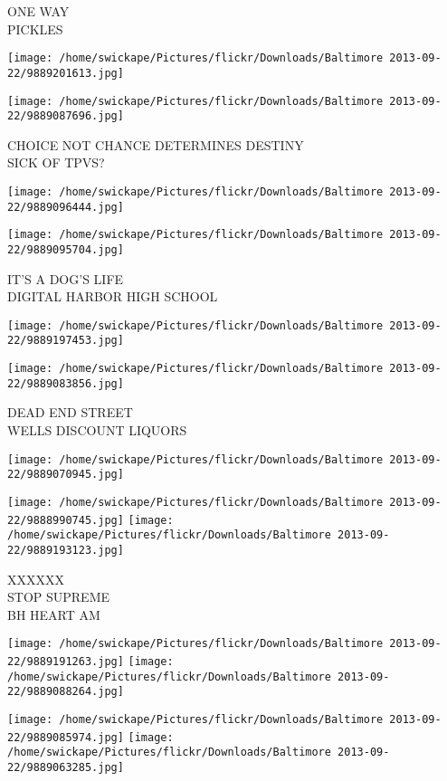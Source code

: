 \documentclass[10pt,letterpaper]{article}
\begin{document}
ONE WAY\\
PICKLES
\pagebreak

\texttt{[image: /home/swickape/Pictures/flickr/Downloads/Baltimore 2013-09-22/9889201613.jpg]}

\vspace{0.25in}
\texttt{[image: /home/swickape/Pictures/flickr/Downloads/Baltimore 2013-09-22/9889087696.jpg]}

CHOICE NOT CHANCE DETERMINES DESTINY\\
SICK OF TPVS?
\pagebreak

\texttt{[image: /home/swickape/Pictures/flickr/Downloads/Baltimore 2013-09-22/9889096444.jpg]}

\vspace{0.25in}
\texttt{[image: /home/swickape/Pictures/flickr/Downloads/Baltimore 2013-09-22/9889095704.jpg]}

IT'S A DOG'S LIFE\\
DIGITAL HARBOR HIGH SCHOOL
\pagebreak

\texttt{[image: /home/swickape/Pictures/flickr/Downloads/Baltimore 2013-09-22/9889197453.jpg]}

\vspace{0.25in}
\texttt{[image: /home/swickape/Pictures/flickr/Downloads/Baltimore 2013-09-22/9889083856.jpg]}

DEAD END STREET\\
WELLS DISCOUNT LIQUORS
\pagebreak

\texttt{[image: /home/swickape/Pictures/flickr/Downloads/Baltimore 2013-09-22/9889070945.jpg]}

\vspace{0.25in}
\texttt{[image: /home/swickape/Pictures/flickr/Downloads/Baltimore 2013-09-22/9888990745.jpg]}
\texttt{[image: /home/swickape/Pictures/flickr/Downloads/Baltimore 2013-09-22/9889193123.jpg]}

XXXXXX\\
STOP SUPREME\\
BH HEART AM
\pagebreak

\texttt{[image: /home/swickape/Pictures/flickr/Downloads/Baltimore 2013-09-22/9889191263.jpg]}
\texttt{[image: /home/swickape/Pictures/flickr/Downloads/Baltimore 2013-09-22/9889088264.jpg]}

\texttt{[image: /home/swickape/Pictures/flickr/Downloads/Baltimore 2013-09-22/9889085974.jpg]}
\texttt{[image: /home/swickape/Pictures/flickr/Downloads/Baltimore 2013-09-22/9889063285.jpg]}
\end{document}

